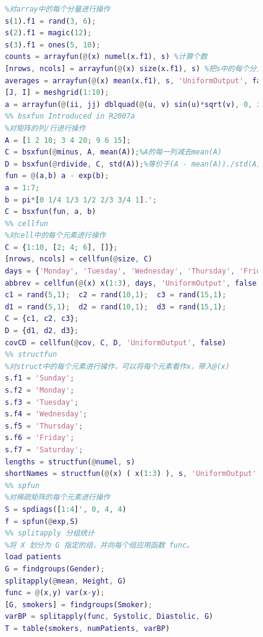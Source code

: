             \begin{lstlisting}[language=Matlab]
            %% arrayfun
            %对array中的每个分量进行操作
            s(1).f1 = rand(3, 6);
            s(2).f1 = magic(12);
            s(3).f1 = ones(5, 10);
            counts = arrayfun(@(x) numel(x.f1), s) %计算个数
            [nrows, ncols] = arrayfun(@(x) size(x.f1), s) %把s中的每个分量作为x输入到@(x) size(x.f1)
            averages = arrayfun(@(x) mean(x.f1), s, 'UniformOutput', false)%因为输出字符向量是nonscalar，故设置 UniformOutput 为false。
            [J, I] = meshgrid(1:10);
            a = arrayfun(@(ii, jj) dblquad(@(u, v) sin(u)*sqrt(v), 0, ii, 0, jj), I, J);
            %% bsxfun Introduced in R2007a
            %对矩阵的列/行进行操作
            A = [1 2 10; 3 4 20; 9 6 15];
            C = bsxfun(@minus, A, mean(A));%A的每一列减去mean(A)
            D = bsxfun(@rdivide, C, std(A));%等价于(A - mean(A))./std(A)
            fun = @(a,b) a - exp(b);
            a = 1:7;
            b = pi*[0 1/4 1/3 1/2 2/3 3/4 1].';
            C = bsxfun(fun, a, b)
            %% cellfun
            %对cell中的每个元素进行操作
            C = {1:10, [2; 4; 6], []};
            [nrows, ncols] = cellfun(@size, C)
            days = {'Monday', 'Tuesday', 'Wednesday', 'Thursday', 'Friday'};
            abbrev = cellfun(@(x) x(1:3), days, 'UniformOutput', false)%因为输出字符向量是nonscalar，故设置 UniformOutput 为false。
            c1 = rand(5,1);  c2 = rand(10,1);  c3 = rand(15,1);
            d1 = rand(5,1);  d2 = rand(10,1);  d3 = rand(15,1);
            C = {c1, c2, c3};
            D = {d1, d2, d3};
            covCD = cellfun(@cov, C, D, 'UniformOutput', false)
            %% structfun
            %对struct中的每个元素进行操作，可以将每个元素看作x，带入@(x)
            s.f1 = 'Sunday';
            s.f2 = 'Monday';
            s.f3 = 'Tuesday';
            s.f4 = 'Wednesday';
            s.f5 = 'Thursday';
            s.f6 = 'Friday';
            s.f7 = 'Saturday';
            lengths = structfun(@numel, s)
            shortNames = structfun(@(x) ( x(1:3) ), s, 'UniformOutput', false)
            %% spfun
            %对稀疏矩阵的每个元素进行操作
            S = spdiags([1:4]', 0, 4, 4)
            f = spfun(@exp,S)
            %% splitapply 分组统计
            %将 X 划分为 G 指定的组，并向每个组应用函数 func。
            load patients
            G = findgroups(Gender);
            splitapply(@mean, Height, G)
            func = @(x,y) var(x-y);
            [G, smokers] = findgroups(Smoker);
            varBP = splitapply(func, Systolic, Diastolic, G)
            T = table(smokers, numPatients, varBP)

\end{lstlisting}
